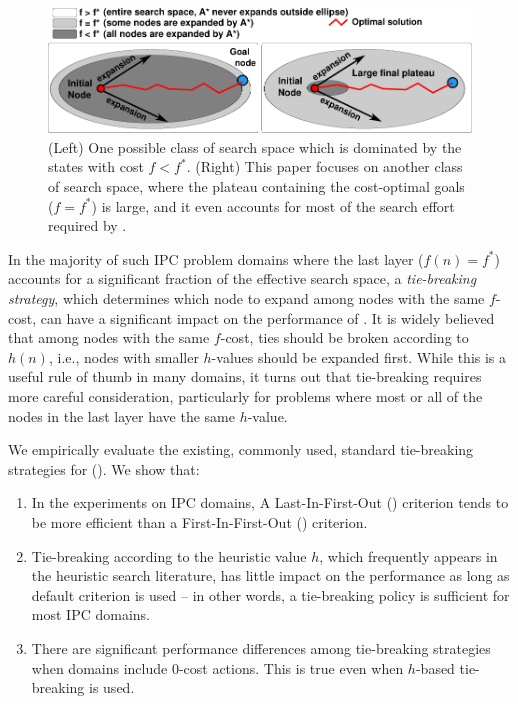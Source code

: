 \begin{figure}[htbp]
  \centering
  \includegraphics{img/astar/plateau-0.pdf}
 \caption{(Left) One possible class of search space which is dominated by the states with cost $f<f^*$. (Right) This paper focuses on another class of search space, where the plateau containing the cost-optimal goals ($f=f^*$) is large, and it even accounts for most of the search effort required by \astar. %
  }
 \label{fig:plateau-0}
\end{figure}

In the majority of such IPC problem domains where
the last layer ($f(n)=f^*$) accounts for a significant fraction of the effective search space, a
\emph{tie-breaking strategy}, which determines which node to expand among nodes with the same $f$-cost,
can have a significant impact on the performance of \astar.
It is widely believed that among nodes with the same $f$-cost,
ties should be broken according to $h(n)$, i.e.,
nodes with smaller $h$-values should be expanded first.  While this is a
useful rule of thumb in many domains, it turns out that tie-breaking
requires more careful consideration, particularly for problems where
most or all of the nodes in the last layer have the same $h$-value.

We empirically evaluate the existing, commonly used, standard
tie-breaking strategies for \astar ().
We show that:

\begin{enumerate}
 \item In the experiments on IPC domains,
       A Last-In-First-Out (\lifo) criterion tends to be more efficient
       than a First-In-First-Out (\fifo) criterion.
 \item Tie-breaking according to the heuristic value $h$, which
       frequently appears in the heuristic search literature, has little
       impact on the performance as long as \lifo default criterion is used 
       --  in other words, a \lifo tie-breaking policy is sufficient for most IPC domains.
 \item There are significant performance differences among tie-breaking strategies
       when domains include 0-cost actions. This is true even when $h$-based tie-breaking is used.
\end{enumerate}

